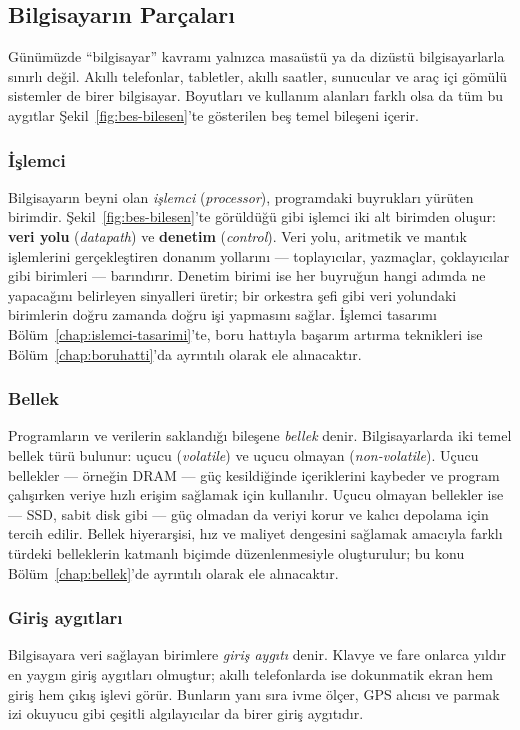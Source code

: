 \subsection{Bilgisayarın Parçaları}
\label{sec:bilgisayar-parcalari}

Günümüzde ``bilgisayar'' kavramı yalnızca masaüstü ya da dizüstü bilgisayarlarla sınırlı değil. Akıllı telefonlar, tabletler, akıllı saatler, sunucular ve araç içi gömülü sistemler de birer bilgisayar. Boyutları ve kullanım alanları farklı olsa da tüm bu aygıtlar Şekil~\ref{fig:bes-bilesen}'te gösterilen beş temel bileşeni içerir.

\subsubsection*{İşlemci}
Bilgisayarın beyni olan \emph{işlemci} (\emph{processor}), programdaki buyrukları yürüten birimdir. Şekil~\ref{fig:bes-bilesen}'te görüldüğü gibi işlemci iki alt birimden oluşur: \textbf{veri yolu} (\emph{datapath}) ve \textbf{denetim} (\emph{control}). Veri yolu, aritmetik ve mantık işlemlerini gerçekleştiren donanım yollarını --- toplayıcılar, yazmaçlar, çoklayıcılar gibi birimleri --- barındırır. Denetim birimi ise her buyruğun hangi adımda ne yapacağını belirleyen sinyalleri üretir; bir orkestra şefi gibi veri yolundaki birimlerin doğru zamanda doğru işi yapmasını sağlar. İşlemci tasarımı Bölüm~\ref{chap:islemci-tasarimi}'te, boru hattıyla başarım artırma teknikleri ise Bölüm~\ref{chap:boruhatti}'da ayrıntılı olarak ele alınacaktır.

\subsubsection*{Bellek}
Programların ve verilerin saklandığı bileşene \emph{bellek} denir. Bilgisayarlarda iki temel bellek türü bulunur: uçucu (\emph{volatile}) ve uçucu olmayan (\emph{non-volatile}). Uçucu bellekler --- örneğin DRAM --- güç kesildiğinde içeriklerini kaybeder ve program çalışırken veriye hızlı erişim sağlamak için kullanılır. Uçucu olmayan bellekler ise --- SSD, sabit disk gibi --- güç olmadan da veriyi korur ve kalıcı depolama için tercih edilir. Bellek hiyerarşisi, hız ve maliyet dengesini sağlamak amacıyla farklı türdeki belleklerin katmanlı biçimde düzenlenmesiyle oluşturulur; bu konu Bölüm~\ref{chap:bellek}'de ayrıntılı olarak ele alınacaktır.

\subsubsection*{Giriş aygıtları}
Bilgisayara veri sağlayan birimlere \emph{giriş aygıtı} denir. Klavye ve fare onlarca yıldır en yaygın giriş aygıtları olmuştur; akıllı telefonlarda ise dokunmatik ekran hem giriş hem çıkış işlevi görür. Bunların yanı sıra ivme ölçer, GPS alıcısı ve parmak izi okuyucu gibi çeşitli algılayıcılar da birer giriş aygıtıdır.

